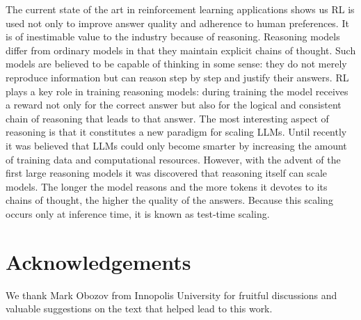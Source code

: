 \documentclass{article}
\numberwithin{equation}{section}
\begin{document}
The current state of the art in reinforcement learning applications shows us RL is used not only to improve answer quality and adherence to human preferences. It is of inestimable value to the industry because of reasoning. Reasoning models differ from ordinary models in that they maintain explicit chains of thought. Such models are believed to be capable of thinking in some sense: they do not merely reproduce information but can reason step by step and justify their answers. RL plays a key role in training reasoning models: during training the model receives a reward not only for the correct answer but also for the logical and consistent chain of reasoning that leads to that answer. The most interesting aspect of reasoning is that it constitutes a new paradigm for scaling LLMs. Until recently it was believed that LLMs could only become smarter by increasing the amount of training data and computational resources. However, with the advent of the first large reasoning models it was discovered that reasoning itself can scale models. The longer the model reasons and the more tokens it devotes to its chains of thought, the higher the quality of the answers. Because this scaling occurs only at inference time, it is known as test‑time scaling.

\section{{Acknowledgements}}

{We thank Mark Obozov from Innopolis University for fruitful discussions and valuable suggestions on the text that helped lead to this work.}



\end{document}
